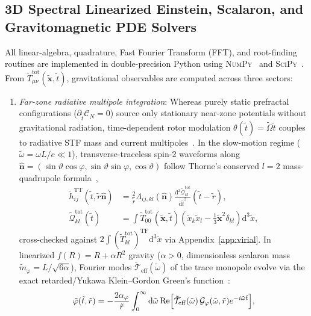 \documentclass[aps,prd,twocolumn,10pt,showkeys,nofootinbib,floatfix,longbibliography]{revtex4-2}
\newcommand{\dd}{\mathrm{d}}
\begin{document}
\subsection{3D Spectral Linearized Einstein, Scalaron, and Gravitomagnetic PDE Solvers}
\label{subsec:methods_pde}
All linear-algebra, quadrature, Fast Fourier Transform (FFT), and root-finding routines are implemented in double-precision Python using \textsc{NumPy}~\cite{harris2020numpy} and \textsc{SciPy}~\cite{virtanen2020scipy}. From $\tilde{T}_{\mu\nu}^{\mathrm{tot}}(\tilde{\mathbf{x}}, \tilde{t})$, gravitational observables are computed across three sectors:
\begin{enumerate}
    \item \emph{Far-zone radiative multipole integration}: Whereas purely static prefractal configurations ($\partial_{\tilde{t}}\mathcal{C}_N = 0$) source only stationary near-zone potentials without gravitational radiation, time-dependent rotor modulation $\theta(\tilde{t}) = \tilde{\Omega}\tilde{t}$ couples to radiative STF mass and current multipoles~\cite{thorne1980rmp}. In the slow-motion regime ($\tilde{\omega} = \omega L/c \ll 1$), transverse-traceless spin-2 waveforms along $\hat{\mathbf{n}} = (\sin\vartheta\cos\varphi, \sin\vartheta\sin\varphi, \cos\vartheta)$ follow Thorne's conserved $l=2$ mass-quadrupole formula~\cite{misner1973,thorne1980rmp,wald1984},
    \begin{align}
    \tilde{h}_{ij}^{\mathrm{TT}}(\tilde{t}, \tilde{r}\hat{\mathbf{n}}) &= \frac{2}{\tilde{r}} \Lambda_{ij,kl}(\hat{\mathbf{n}}) \frac{\dd^2 \tilde{\mathcal{Q}}_{kl}^{\mathrm{tot}}}{\dd\tilde{t}^2}(\tilde{t} - \tilde{r}), \nonumber\\
    \tilde{\mathcal{Q}}_{kl}^{\mathrm{tot}}(\tilde{t}) &= \int \tilde{T}_{00}^{\mathrm{tot}}(\tilde{\mathbf{x}}, \tilde{t})\left(\tilde{x}_k\tilde{x}_l - \frac{1}{3}\tilde{\mathbf{x}}^2\delta_{kl}\right)\dd^3\tilde{x},
    \label{eq:tt_quadrupole_wave}
    \end{align}
    cross-checked against $2\int (\tilde{T}_{kl}^{\mathrm{tot}})^{\mathrm{TF}} \dd^3\tilde{x}$ via Appendix~\ref{app:virial}. In linearized $f(R) = R + \alpha R^2$ gravity ($\alpha > 0$, dimensionless scalaron mass $\tilde{m}_\varphi = L/\sqrt{6\alpha}$), Fourier modes $\tilde{\mathcal{T}}_{\mathrm{eff}}(\tilde{\omega})$ of the trace monopole evolve via the exact retarded/Yukawa Klein--Gordon Green's function~\cite{berry2011}:
    \begin{align}
    \tilde{\varphi}(\tilde{t}, \tilde{r}) &= -\frac{2\alpha_\varphi}{\tilde{r}} \int_0^\infty \dd\tilde{\omega}\,\mathrm{Re}\Bigl[\tilde{\mathcal{T}}_{\mathrm{eff}}(\tilde{\omega}) \, \mathcal{G}_\varphi(\tilde{\omega}, \tilde{r}) e^{-i\tilde{\omega}\tilde{t}}\Bigr], \nonumber\\

\end{align}
\end{enumerate}
\end{document}
